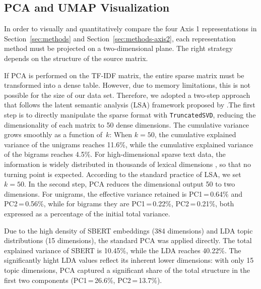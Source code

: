 \subsection{PCA and UMAP Visualization}
\label{sec:methods-dr}

In order to visually and quantitatively compare the four Axis 1 representations in Section~\ref{sec:methods} and Section~\ref{sec:methods-axis2}, each representation method must be projected on a two-dimensional plane. The right strategy depends on the structure of the source matrix. 


If PCA is performed on the TF-IDF matrix, the entire sparse matrix must be transformed into a dense table. However, due to memory limitations, this is not possible for the size of our data set. Therefore, we adopted a two-step approach that follows the latent semantic analysis (LSA) framework proposed by \citet{deerwester1990indexing}.The first step is to directly manipulate the sparse format with \texttt{TruncatedSVD}, reducing the dimensionality of each matrix to 50 dense dimensions. The cumulative variance grows smoothly as a function of~$k$: When $k{=}50$, the cumulative explained variance of the unigrams reaches 11.6\%, while the cumulative explained variance of the bigrams reaches 4.5\%. For high-dimensional sparse text data, the information is widely distributed in thousands of lexical dimensions \citep{deerwester1990indexing}, so that no turning point is expected. According to the standard practice of LSA, we set $k{=}50$. In the second step, PCA reduces the dimensional output 50 to two dimensions. For unigrams, the effective variance retained is  PC1\,=\,0.64\% and PC2\,=\,0.56\%, while for bigrams they are PC1\,=\,0.22\%, PC2\,=\,0.21\%, both expressed as a percentage of the initial total variance.


Due to the high density of SBERT embeddings (384 dimensions) and LDA topic distributions (15 dimensions), the standard PCA was applied directly. The total explained variance of SBERT is 10.45\%, while the LDA reaches 40.22\%. The significantly hight LDA values reflect its inherent lower dimensions: with only 15 topic dimensions, PCA captured a significant share of the total structure in the first two components (PC1\,=\,26.6\%, PC2\,=\,13.7\%).


